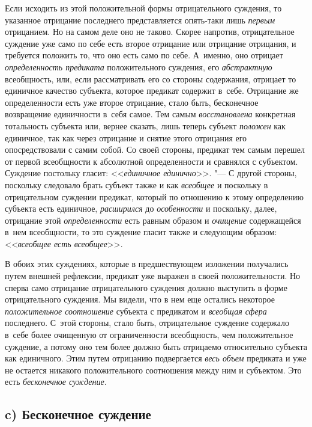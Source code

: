 Если исходить из этой положительной формы отрицательного суждения, то указанное
отрицание последнего представляется опять-таки лишь {\em первым} отрицанием.
Но на самом деле оно не таково. Скорее напротив, отрицательное суждение уже
само по себе есть второе отрицание или отрицание отрицания, и требуется
положить то, что оно есть само по себе. А~именно, оно отрицает
{\em определенность предиката} положительного суждения, его {\em абстрактную}
всеобщность, или, если рассматривать его со стороны содержания, отрицает то
единичное качество субъекта, которое предикат содержит в~себе. Отрицание же
определенности есть уже второе отрицание, стало быть, бесконечное возвращение
единичности в~себя самое. Тем самым {\em восстановлена} конкретная тотальность
субъекта или, вернее сказать, лишь теперь субъект {\em положен} как единичное,
так как через отрицание и снятие этого отрицания его опосредствовали с самим
собой. Со своей стороны, предикат тем самым перешел от первой всеобщности к
абсолютной определенности и сравнялся с субъектом. Суждение постольку гласит:
<<{\em единичное единично}>>. "--- С другой стороны, поскольку следовало брать
субъект также и как {\em всеобщее} и поскольку в отрицательном суждении
предикат, который по отношению к этому определению субъекта есть единичное,
{\em расширился} до {\em особенности} и поскольку, далее, отрицание этой
{\em определенности} есть равным образом и {\em очищение} содержащейся в~нем
всеобщности, то это суждение гласит также и следующим образом:
<<{\em всеобщее есть всеобщее}>>.

В обоих этих суждениях, которые в предшествующем
изложении
получались путем внешней рефлексии, предикат уже выражен в
своей положительности. Но сперва само отрицание отрицательного суждения
должно выступить в форме отрицательного суждения. Мы видели, что в нем еще
остались некоторое {\em положительное соотношение} субъекта с предикатом и
{\em всеобщая сфера} последнего. С~этой стороны, стало быть,
отрицательное суждение содержало в~себе более очищенную от ограниченности
всеобщность, чем положительное суждение, а потому оно тем более должно быть
отрицаемо относительно субъекта как единичного. Этим путем отрицанию
подвергается {\em весь объем} предиката и уже не остается никакого
положительного соотношения между ним и субъектом. Это есть
{\em бесконечное суждение}.

\subsection[c) Бесконечное суждение]{c) Бесконечное суждение}

